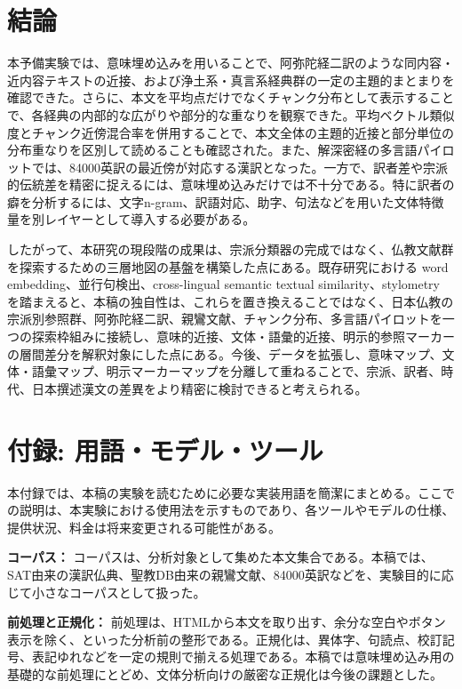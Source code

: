 \documentclass[uplatex,dvipdfmx,11pt,a4paper]{jsarticle}
\begin{document}
\section{結論}

本予備実験では、意味埋め込みを用いることで、阿弥陀経二訳のような同内容・近内容テキストの近接、および浄土系・真言系経典群の一定の主題的まとまりを確認できた。さらに、本文を平均点だけでなくチャンク分布として表示することで、各経典の内部的な広がりや部分的な重なりを観察できた。平均ベクトル類似度とチャンク近傍混合率を併用することで、本文全体の主題的近接と部分単位の分布重なりを区別して読めることも確認された。また、解深密経の多言語パイロットでは、84000英訳の最近傍が対応する漢訳となった。一方で、訳者差や宗派的伝統差を精密に捉えるには、意味埋め込みだけでは不十分である。特に訳者の癖を分析するには、文字n-gram、訳語対応、助字、句法などを用いた文体特徴量を別レイヤーとして導入する必要がある。

したがって、本研究の現段階の成果は、宗派分類器の完成ではなく、仏教文献群を探索するための三層地図の基盤を構築した点にある。既存研究における word embedding、並行句検出、cross-lingual semantic textual similarity、stylometry を踏まえると、本稿の独自性は、これらを置き換えることではなく、日本仏教の宗派別参照群、阿弥陀経二訳、親鸞文献、チャンク分布、多言語パイロットを一つの探索枠組みに接続し、意味的近接、文体・語彙的近接、明示的参照マーカーの層間差分を解釈対象にした点にある。今後、データを拡張し、意味マップ、文体・語彙マップ、明示マーカーマップを分離して重ねることで、宗派、訳者、時代、日本撰述漢文の差異をより精密に検討できると考えられる。

\section*{付録: 用語・モデル・ツール}

本付録では、本稿の実験を読むために必要な実装用語を簡潔にまとめる。ここでの説明は、本実験における使用法を示すものであり、各ツールやモデルの仕様、提供状況、料金は将来変更される可能性がある。

\noindent\textbf{コーパス：} コーパスは、分析対象として集めた本文集合である。本稿では、SAT由来の漢訳仏典、聖教DB由来の親鸞文献、84000英訳などを、実験目的に応じて小さなコーパスとして扱った。

\noindent\textbf{前処理と正規化：} 前処理は、HTMLから本文を取り出す、余分な空白やボタン表示を除く、といった分析前の整形である。正規化は、異体字、句読点、校訂記号、表記ゆれなどを一定の規則で揃える処理である。本稿では意味埋め込み用の基礎的な前処理にとどめ、文体分析向けの厳密な正規化は今後の課題とした。
\end{document}
